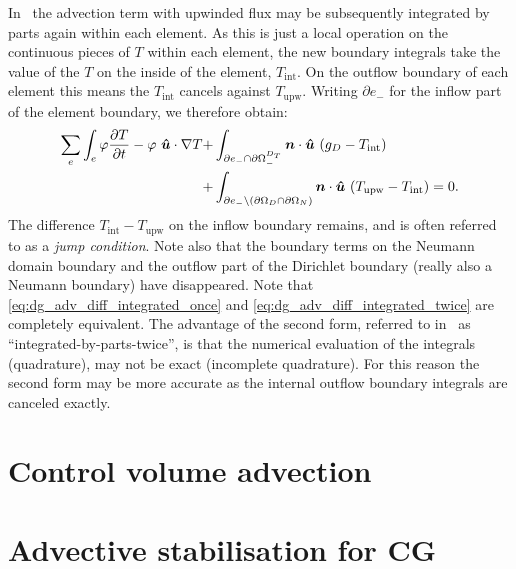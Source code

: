 In \fluidity\ the advection term with upwinded flux may be subsequently
integrated by parts again within each element. As this is just a local
operation on the continuous pieces of $T$ within each element, the new
boundary integrals take the value of the $T$ on the inside of the element,
$T_{\mathrm{int}}$. On the outflow boundary of each element this means the
$T_{\mathrm{int}}$ cancels against $T_{\mathrm{upw}}$. Writing $\partial
e_-$ for the inflow part of the element boundary, we therefore obtain:
\begin{equation}
\begin{split}
  \sum_e\int_e \varphi \frac{\partial T}{\partial t}
  - \varphi~{\mbox{\boldmath$\hat u$}}\cdot\nabla T 
    +& \int_{\partial e_- \cap\partial\Omega^{D_T}_-} {\mbox{\boldmath$n$}}\cdot{\mbox{\boldmath$\hat u$}}~(g_D -T_{\mathrm{int}}) \\
    +& \int_{\partial e_-\setminus (\partial\Omega_D\cap\partial\Omega_N)}
    {\mbox{\boldmath$n$}}\cdot{\mbox{\boldmath$\hat u$}}~
      (T_{\mathrm{upw}}-T_{\mathrm{int}})=0.
    \label{eq:dg_adv_diff_integrated_twice}
\end{split}
\end{equation}
The difference $T_{\mathrm{int}}-T_{\mathrm{upw}}$ on the inflow boundary
remains, and is often referred to as a \emph{jump condition}. Note also that
the boundary terms on the Neumann domain boundary and the outflow part of
the Dirichlet boundary (really also a Neumann boundary) have disappeared.
Note that \eqref{eq:dg_adv_diff_integrated_once} and
\eqref{eq:dg_adv_diff_integrated_twice} are completely equivalent. The
advantage of the second form, referred to in \fluidity\ as
``integrated-by-parts-twice'', is that the numerical evaluation of the
integrals (quadrature), may not be exact (incomplete quadrature). For this
reason the second form may be more accurate as the internal outflow boundary
integrals are canceled exactly.

\section{Control volume advection}
\label{ControlVolumeAdvection}


\section{Advective stabilisation for CG}
\label{Sect:ND_advective_stabilisation_CG}

